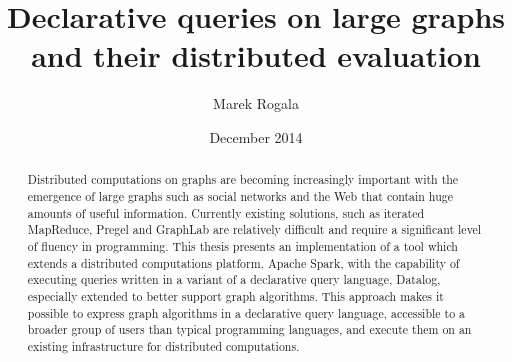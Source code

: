 \documentclass{pracamgr}
\author{Marek Rogala}
\title{Declarative queries on large graphs and their distributed evaluation}
\date{December 2014}
\theoremstyle{plain}
\theoremstyle{definition}
\theoremstyle{remark}
\begin{document}
\maketitle

\begin{abstract}
Distributed computations on graphs are becoming increasingly important with the emergence of large graphs such as social networks and the Web that contain huge amounts of useful information.
Currently existing solutions, such as iterated MapReduce, Pregel and GraphLab are relatively difficult and require a significant level of fluency in programming.
This thesis presents an implementation of a tool which extends a distributed computations platform, Apache Spark, with the capability of executing queries written in a variant of a declarative query language, Datalog, especially extended to better support graph algorithms.
This approach makes it possible to express graph algorithms in a declarative query language, accessible to a broader group of users than typical programming languages, and execute them on an existing infrastructure for distributed computations.
\end{abstract}

\tableofcontents













\appendix




\end{document}
